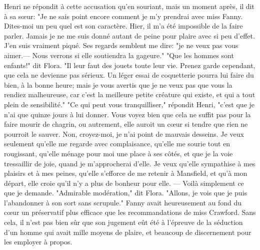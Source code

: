 Henri ne répondit à cette accusation qu'en souriant, mais un moment après, il dit à sa sœur: "Je ne sais point encore comment je m'y prendrai avec miss Fanny. Dites-moi un peu quel est son caractère. Hier, il m'a été impossible de la faire parler. Jamais je ne me suis donné autant de peine pour plaire avec si peu d'effet. J'en suis vraiment piqué. Ses regards semblent me dire: "je ne veux pas vous aimer.— Nous verrons si elle soutiendra la gageure."\setcounter{page}{252} "Que les hommes sont enfants!" dit Flora. "Il leur faut des jouets toute leur vie. Prenez garde cependant, que cela ne devienne pas sérieux. Un léger essai de coquetterie pourra lui faire du bien, à la bonne heure; mais je vous avertis que je ne veux pas que vous la rendiez malheureuse, car c'est la meilleure petite créature qui existe, et qui a tout plein de sensibilité." "Ce qui peut vous tranquilliser," répondit Henri, "c'est que je n'ai que quinze jours à lui donner. Vous voyez bien que cela ne suffit pas pour la faire mourir de chagrin, ou autrement, elle auroit un cœur si tendre que rien ne pourroit le sauver. Non, croyez-moi, je n'ai point de mauvais desseins. Je veux seulement qu'elle me regarde avec complaisance, qu'elle me sourie tout en rougissant, qu'elle ménage pour moi une place à ses côtés, et que je la voie tressaillir de joie, quand je m'approcherai d'elle. Je veux qu'elle sympathise à mes plaisirs et à mes peines, qu'elle s'efforce de me retenir à Mansfield, et qu'à mon départ, elle croie qu'il n'y a plus de bonheur pour elle. — Voilà simplement ce que je demande. "Admirable modération," dit Flora. "Allons, je vois que je puis l'abandonner à son sort sans scrupule."\setcounter{page}{253} Fanny avait heureusement au fond du cœur un préservatif plus efficace que les recommandations de miss Crawford. Sans cela, il n’est pas bien sûr que son jugement eût été à l’épreuve de la séduction d’un homme qui avait mille moyens de plaire, et beaucoup de discernement pour les employer à propos.
